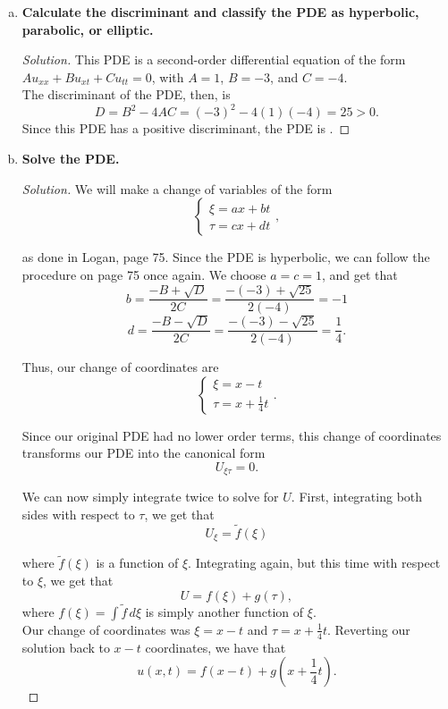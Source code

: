 \documentclass[11pt]{article}
\newenvironment{solution}
  {\renewcommand\qedsymbol{$\blacksquare$}\begin{proof}[Solution]}
  {\end{proof}}
\begin{document}
\begin{enumerate}[a)]
\item \textbf{Calculate the discriminant and classify the PDE as hyperbolic, parabolic, or elliptic.} 
\begin{solution}
This PDE is a second-order differential equation of the form $Au_{xx} + Bu_{xt} + Cu_{tt} = 0$, with $A = 1$, $B = -3$, and $C=-4.$ \\

The discriminant of the PDE, then, is \[D = B^2 - 4AC = (-3)^2 - 4(1)(-4) = \boxed{25} > 0.\]
Since this PDE has a positive discriminant, the PDE is .
\end{solution}

\item \textbf{Solve the PDE.}
\begin{solution}
We will make a change of variables of the form 
\[\begin{cases}
\xi = ax + bt \\
\tau = cx+dt
\end{cases},\]

as done in Logan, page 75. Since the PDE is hyperbolic, we can follow the procedure on page 75 once again. We choose $ a = c = 1$, and get that
\[ b = \frac{-B + \sqrt{D}}{2C} = \frac{-(-3) + \sqrt{25}}{2(-4)} = -1 \]
\[ d =  \frac{-B - \sqrt{D}}{2C} = \frac{-(-3) - \sqrt{25}}{2(-4)} = \frac{1}{4}. \]

Thus, our change of coordinates are 
\[\begin{cases}
	\xi = x - t \\
	\tau = x + \frac{1}{4}t
	\end{cases}.\]

Since our original PDE had no lower order terms, this change of coordinates transforms our PDE into the canonical form \[U_{\xi\tau} = 0.\]

We can now simply integrate twice to solve for $U$. First, integrating both sides with respect to $\tau$, we get that
\[U_{\xi} = \tilde{f}(\xi) \]

where $\tilde{f}(\xi)$ is a function of $\xi.$ Integrating again, but this time with respect to $\xi$, we get that
\[U = f(\xi) + g(\tau), \]
where $f(\xi) = \int \tilde{f} \, d\xi$ is simply another function of $\xi$. \\

Our change of coordinates was $\xi = x - t$ and $\tau = x + \frac{1}{4}t$. Reverting our solution back to $x-t$ coordinates, we have that
\[ u(x, t) = f(x-t) + g\left(x+\frac{1}{4}t\right). \]


\end{solution}
\end{enumerate}
\end{document}
